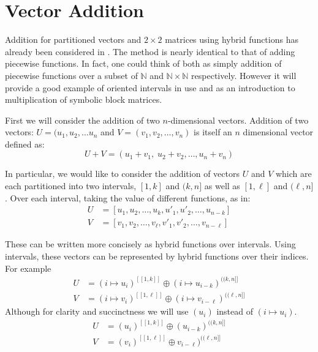 %
%

\section{Vector Addition}
Addition for partitioned vectors and $2 \times 2$ matrices using hybrid functions has already been considered in \cite{carette2010}.
The method is nearly identical to that of adding piecewise functions.
In fact, one could think of both as simply addition of piecewise functions over a subset of 
$\mathbb{N}$ and $\mathbb{N} \times \mathbb{N}$ respectively.
However it will provide a good example of oriented intervals in use and as an introduction to multiplication of 
symbolic block matrices.


First we will consider the addition of two $n$-dimensional vectors.
Addition of two vectors: $U= (u_1, u_2, \ldots u_n$ and $V = (v_1, v_2, \ldots, v_n)$ is itself an $n$ dimensional vector 
defined as:
\begin{equation}
	U+V = (u_1+v_1, \; u_2+v_2, \ldots, u_n+v_n)
\end{equation}


In particular, we would like to consider the addition of vectors $U$ and $V$ which are each partitioned into two intervals,
$[1,k]$ and $(k,n]$ as well as $[1,\ell]$ and $(\ell, n]$.
Over each interval, taking the value of different functions, as in:
\begin{align}
	U &= [ u_1, u_2, \ldots, u_{k}, u'_1, u'_2, \ldots, u_{n-k} ] \\
	V &= [ v_1, v_2, \ldots, v_{\ell}, v'_1, v'_2, \ldots, v_{n-\ell} ]
\end{align}


These can be written more concisely as hybrid functions over intervals. 
Using intervals, these vectors can be represented by hybrid functions over their indices.
For example
\begin{align}
	U &= (i \mapsto u_i)^{[\![1, k]\!]} \oplus (i \mapsto u_{i-k})^{(\!(k,n]\!]} \\
	V &= (i \mapsto v_i)^{[\![1, \ell]\!]} \oplus (i \mapsto v_{i-\ell})^{(\!(\ell,n]\!]}
\end{align}
Although for clarity and succinctness we will use $(u_i)$ instead of $(i \mapsto u_i)$.
\begin{align}
	U &= (u_i)^{[\![1, k]\!]} \oplus (u_{i-k})^{(\!(k,n]\!]} \\
	V &= (v_i)^{[\![1, \ell]\!]} \oplus v_{i-\ell})^{(\!(\ell,n]\!]}
\end{align}



